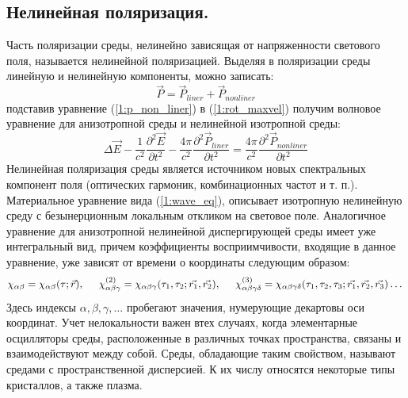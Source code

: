 \subsection{Нелинейная поляризация.} 
Часть поляризации среды, нелинейно зависящая от напряженности светового поля, называется нелинейной поляризацией.
Выделяя в поляризации среды линейную и нелинейную компоненты, можно
записать:
\begin{equation}\label{1:p_non_liner}
\vec{P} = \vec{P}_{liner} + \vec{P}_{nonliner}
\end{equation}
подставив уравнение  (\ref{1:p_non_liner}) в  (\ref{1:rot_maxvel}) получим волновое уравнение для анизотропной среды и нелинейной изотропной среды:
\begin{equation}\label{1:wave_eq2}
\Delta\vec{E} - \frac{ 1 }{ c^2 }\frac{\partial^2 \vec{E} }{\partial t^2} - \frac{ 4\pi }{ c^2 }\frac{\partial^2 \vec{P}_{liner}}{\partial t^2} =  \frac{ 4\pi }{ c^2 }\frac{\partial^2 \vec{P} _{nonliner}}{\partial t^2}
\end{equation}
 Нелинейная поляризация среды является источником новых спектральных компонент поля
(оптических гармоник, комбинационных частот и т. п.). Материальное уравнение вида  (\ref{1:wave_eq}), описывает изотропную нелинейную среду с безынерционным локальным откликом на световое поле. Аналогичное
уравнение для анизотропной нелинейной диспергирующей среды имеет уже интегральный вид, причем коэффициенты восприимчивости, входящие в данное уравнение, уже зависят от времени о координаты следующим образом:
 \begin{equation}\label{1:chi}
\chi_{\alpha \beta} =  \chi_{\alpha \beta}(\tau ; \vec{r}),
\hspace{5mm}
\chi_{\alpha\beta\gamma}^{(2)}= \chi_{\alpha\beta\gamma}(\tau_{1},\tau_{2};\vec{r_{1}}, \vec{r_{2} }),
\hspace{5mm}
\chi_{\alpha\beta\gamma\delta}^{(3)} = \chi_{\alpha\beta\gamma\delta}(\tau_{1},\tau_{2},\tau_{3};\vec{r_{1}}, \vec{r_{2}}, \vec{r_{3} })
\dots
\end{equation}
Здесь индексы $\alpha, \beta, \gamma, \dots$ пробегают значения, нумерующие декартовы оси координат. Учет нелокальности важен втех случаях, когда элементарные осцилляторы среды, расположенные в различных точках пространства, связаны и взаимодействуют между собой. Среды, обладающие таким свойством, называют средами с пространственной дисперсией. К их числу относятся некоторые типы кристаллов, а также плазма.
